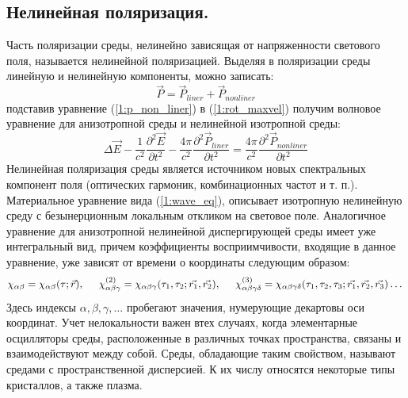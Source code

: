 \subsection{Нелинейная поляризация.} 
Часть поляризации среды, нелинейно зависящая от напряженности светового поля, называется нелинейной поляризацией.
Выделяя в поляризации среды линейную и нелинейную компоненты, можно
записать:
\begin{equation}\label{1:p_non_liner}
\vec{P} = \vec{P}_{liner} + \vec{P}_{nonliner}
\end{equation}
подставив уравнение  (\ref{1:p_non_liner}) в  (\ref{1:rot_maxvel}) получим волновое уравнение для анизотропной среды и нелинейной изотропной среды:
\begin{equation}\label{1:wave_eq2}
\Delta\vec{E} - \frac{ 1 }{ c^2 }\frac{\partial^2 \vec{E} }{\partial t^2} - \frac{ 4\pi }{ c^2 }\frac{\partial^2 \vec{P}_{liner}}{\partial t^2} =  \frac{ 4\pi }{ c^2 }\frac{\partial^2 \vec{P} _{nonliner}}{\partial t^2}
\end{equation}
 Нелинейная поляризация среды является источником новых спектральных компонент поля
(оптических гармоник, комбинационных частот и т. п.). Материальное уравнение вида  (\ref{1:wave_eq}), описывает изотропную нелинейную среду с безынерционным локальным откликом на световое поле. Аналогичное
уравнение для анизотропной нелинейной диспергирующей среды имеет уже интегральный вид, причем коэффициенты восприимчивости, входящие в данное уравнение, уже зависят от времени о координаты следующим образом:
 \begin{equation}\label{1:chi}
\chi_{\alpha \beta} =  \chi_{\alpha \beta}(\tau ; \vec{r}),
\hspace{5mm}
\chi_{\alpha\beta\gamma}^{(2)}= \chi_{\alpha\beta\gamma}(\tau_{1},\tau_{2};\vec{r_{1}}, \vec{r_{2} }),
\hspace{5mm}
\chi_{\alpha\beta\gamma\delta}^{(3)} = \chi_{\alpha\beta\gamma\delta}(\tau_{1},\tau_{2},\tau_{3};\vec{r_{1}}, \vec{r_{2}}, \vec{r_{3} })
\dots
\end{equation}
Здесь индексы $\alpha, \beta, \gamma, \dots$ пробегают значения, нумерующие декартовы оси координат. Учет нелокальности важен втех случаях, когда элементарные осцилляторы среды, расположенные в различных точках пространства, связаны и взаимодействуют между собой. Среды, обладающие таким свойством, называют средами с пространственной дисперсией. К их числу относятся некоторые типы кристаллов, а также плазма.
